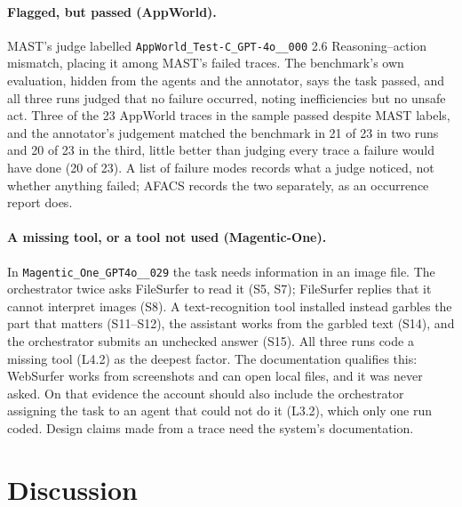 \documentclass[10pt]{article}
\newcommand{\code}[1]{\texttt{#1}}
\begin{document}
\paragraph{Flagged, but passed (AppWorld).} MAST's judge labelled
\code{AppWorld\_Test-C\_GPT-4o\_\_000} 2.6 Reasoning--action mismatch, placing it
among MAST's failed traces. The benchmark's own evaluation, hidden from the agents
and the annotator, says the task passed, and all three runs judged that no failure
occurred, noting inefficiencies but no unsafe act. Three of the 23 AppWorld traces
in the sample passed despite MAST labels, and the annotator's judgement matched the benchmark in 21 of 23 in two runs and 20 of 23 in the third, little better than judging every trace a failure would have done (20 of 23). A list of failure modes records what a judge noticed, not
whether anything failed; AFACS records the two separately, as an occurrence report
does.

\paragraph{A missing tool, or a tool not used (Magentic-One).} In
\code{Magentic\_One\_GPT4o\_\_029} the task needs information in an image file. The
orchestrator twice asks FileSurfer to read it (S5, S7); FileSurfer replies that it
cannot interpret images (S8). A text-recognition tool installed instead garbles the
part that matters (S11--S12), the assistant works from the garbled text (S14), and
the orchestrator submits an unchecked answer (S15). All three runs code a missing
tool (L4.2) as the deepest factor. The documentation qualifies this: WebSurfer
works from screenshots and can open local files, and it was never asked. On that
evidence the account should also include the orchestrator assigning the task to an
agent that could not do it (L3.2), which only one run coded. Design claims made
from a trace need the system's documentation.

\fussy
\section{Discussion}
\end{document}

